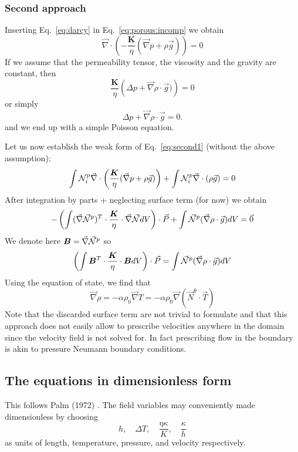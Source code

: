 \subsubsection{Second approach}



Inserting Eq.~\eqref{eq:darcy} in Eq.~\eqref{eq:porous:incomp}
we obtain
\begin{equation}
\vec\nabla \cdot 
\left( -\frac{{\bm K}}{\eta} (\vec\nabla p + \rho \vec{g}) \right) = 0
\label{eq:second1}
\end{equation}
If we assume that the permeability tensor, the viscosity and the gravity are constant, then 
\[
\frac{{\bm K}}{\eta} \left(\Delta p + \vec\nabla\rho\cdot \vec{g}) \right) = 0
\]
or simply
\[
\Delta p + \vec\nabla\rho\cdot \vec{g} = 0.
\]
and we end up with a simple Poisson equation. 

Let us now establish the weak form of Eq.~\eqref{eq:second1} (without the above assumption): 
\[
\int {\mathcal{N}}_i^p \vec\nabla \cdot 
\left( \frac{{\bm K}}{\eta} (\vec\nabla p + \rho \vec{g}) \right) 
+\int {\mathcal{N}}^p_i \vec\nabla \cdot (\rho \vec{g}) = 0
\]
After integration by parts + neglecting surface term (for now) we obtain
\[
-\left( \int (\vec\nabla \vec{{\mathcal{N}}}^p)^T \cdot \frac{\bm K}{\eta} \cdot \vec\nabla \vec{{\mathcal{N}}} dV \right) \cdot \vec{P} 
+ \int \vec{{\mathcal{N}}}^p (\vec\nabla \rho \cdot \vec{g}) dV = \vec{0}
\]
We denote here ${\bm B} = \vec\nabla \vec {{\mathcal{N}}}^p$ so 
\[
\left( \int {\bm B}^T \cdot \frac{\bm K}{\eta} \cdot {\bm B} dV \right) \cdot \vec{P}
=
\int \vec{{\mathcal{N}}}^p (\vec\nabla \rho \cdot \vec{g}) dV
\]
Using the equation of state, 
we find that 
\[
\vec\nabla \rho = -\alpha \rho_0 \vec\nabla T 
= -\alpha \rho_0 \vec\nabla (\vec{N}^\uptheta \cdot \vec{T})
\]
Note that the discarded surface term are not trivial to formulate and that this approach does not easily allow to 
prescribe velocities anywhere in the domain since the velocity 
field is not solved for. 
In fact prescribing flow in the boundary is akin to pressure Neumann boundary conditions.






\subsection{The equations in dimensionless form}

This follows Palm \etal (1972) \cite{pawk72}.
The field variables may conveniently made dimensionless by choosing \[
h, \quad \Delta T, \quad \frac{\eta \kappa}{K}, \quad \frac{\kappa}{h}
\]
as units of length, temperature, pressure, and velocity respectively.

